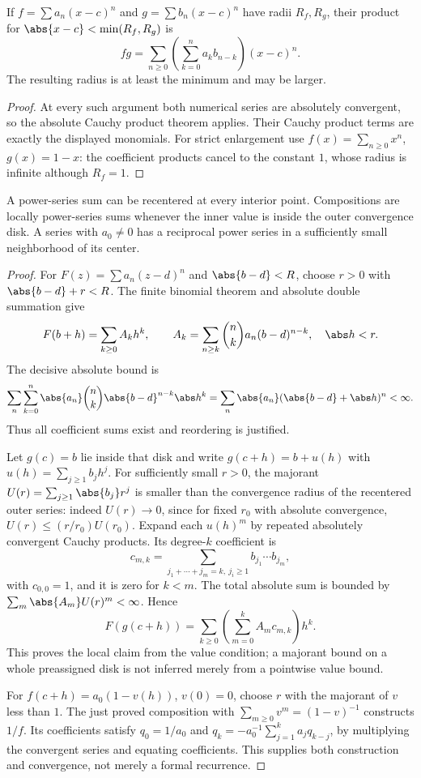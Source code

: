 \begin{theorem}
If $f=\sum a_n(x-c)^n$ and $g=\sum b_n(x-c)^n$ have radii $R_f,R_g$, their product for $\abs{x-c}<\min(R_f,R_g)$ is
\[fg=\sum_{n\geq0}\left(\sum_{k=0}^na_kb_{n-k}\right)(x-c)^n.\]
The resulting radius is at least the minimum and may be larger.
\end{theorem}
\begin{proof}
At every such argument both numerical series are absolutely convergent, so the absolute Cauchy product theorem  applies. Their Cauchy product terms are exactly the displayed monomials. For strict enlargement use $f(x)=\sum_{n\geq0}x^n$, $g(x)=1-x$: the coefficient products cancel to the constant $1$, whose radius is infinite although $R_f=1$.
\end{proof}

\begin{theorem}
A power-series sum can be recentered at every interior point. Compositions are locally power-series sums whenever the inner value is inside the outer convergence disk. A series with $a_0\ne0$ has a reciprocal power series in a sufficiently small neighborhood of its center.
\end{theorem}
\begin{proof}
For $F(z)=\sum a_n(z-d)^n$ and $\abs{b-d}<R$, choose $r>0$ with $\abs{b-d}+r<R$. The finite binomial theorem and absolute double summation give
\[F(b+h)=\sum_{k\geq0}A_kh^k,\qquad A_k=\sum_{n\geq k}\binom nk a_n(b-d)^{n-k},\quad \abs h<r.\]
The decisive absolute bound is
\[\sum_n\sum_{k=0}^n\abs{a_n}\binom nk\abs{b-d}^{n-k}\abs h^k=\sum_n\abs{a_n}(\abs{b-d}+\abs h)^n<\infty.\]
Thus all coefficient sums exist and reordering is justified.

Let $g(c)=b$ lie inside that disk and write $g(c+h)=b+u(h)$ with $u(h)=\sum_{j\geq1}b_jh^j$. For sufficiently small $r>0$, the majorant $U(r)=\sum_{j\geq1}\abs{b_j}r^j$ is smaller than the convergence radius of the recentered outer series: indeed $U(r)\to0$, since for fixed $r_0$ with absolute convergence, $U(r)\leq(r/r_0)U(r_0)$. Expand each $u(h)^m$ by repeated absolutely convergent Cauchy products. Its degree-$k$ coefficient is
\[c_{m,k}=\sum_{j_1+\cdots+j_m=k,\ j_i\geq1}b_{j_1}\cdots b_{j_m},\]
with $c_{0,0}=1$, and it is zero for $k<m$. The total absolute sum is bounded by $\sum_m\abs{A_m}U(r)^m<\infty$. Hence
\[F(g(c+h))=\sum_{k\geq0}\left(\sum_{m=0}^kA_mc_{m,k}\right)h^k.\]
This proves the local claim from the value condition; a majorant bound on a whole preassigned disk is not inferred merely from a pointwise value bound.

For $f(c+h)=a_0(1-v(h))$, $v(0)=0$, choose $r$ with the majorant of $v$ less than $1$. The just proved composition with $\sum_{m\geq0}v^m=(1-v)^{-1}$ constructs $1/f$. Its coefficients satisfy $q_0=1/a_0$ and $q_k=-a_0^{-1}\sum_{j=1}^ka_jq_{k-j}$, by multiplying the convergent series and equating coefficients. This supplies both construction and convergence, not merely a formal recurrence.
\end{proof}

